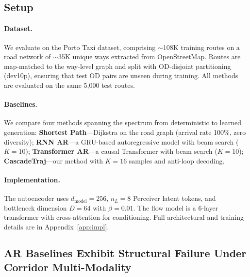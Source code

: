 
\subsection{Setup}

\paragraph{Dataset.}
We evaluate on the Porto Taxi dataset, comprising $\sim$108K training routes on a road network of $\sim$35K unique ways extracted from OpenStreetMap.
Routes are map-matched to the way-level graph and split with OD-disjoint partitioning (dev10p), ensuring that test OD pairs are unseen during training.
All methods are evaluated on the same 5{,}000 test routes.

\paragraph{Baselines.}
We compare four methods spanning the spectrum from deterministic to learned generation:
\textbf{Shortest Path}---Dijkstra on the road graph (arrival rate 100\%, zero diversity);
\textbf{RNN AR}---a GRU-based autoregressive model with beam search ($K\!=\!10$);
\textbf{Transformer AR}---a causal Transformer with beam search ($K\!=\!10$);
\textbf{CascadeTraj}---our method with $K\!=\!16$ samples and anti-loop decoding.

\paragraph{Implementation.}
The autoencoder uses $d_{\mathrm{model}}\!=\!256$, $n_L\!=\!8$ Perceiver latent tokens, and bottleneck dimension $D\!=\!64$ with $\beta\!=\!0.01$.
The flow model is a 6-layer transformer with cross-attention for conditioning.
Full architectural and training details are in Appendix~\ref{app:impl}.

\subsection{AR Baselines Exhibit Structural Failure Under Corridor Multi-Modality}
\label{sec:main-results}


